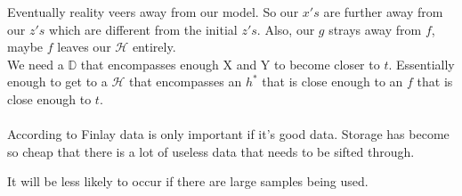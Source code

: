\documentclass[12pt]{article}
\begin{document}
\begin{enumerate}
Eventually reality veers away from our model. So our $x's$ are further away from our $z's$ which are different from the initial $z's$. Also, our $g$ strays away from $f$, maybe $f$ leaves our $\mathcal{H}$ entirely.
\\
We need a $\mathbb{D}$ that encompasses enough X and Y to become closer to $t$. Essentially enough to get to a $\mathcal{H}$ that encompasses an $h^*$ that is close enough to an $f$ that is close enough to $t$. \\
\\

According to Finlay data is only important if it's good data. Storage has become so cheap that there is a lot of useless data that needs to be sifted through.


It will be less likely to occur if there are large samples being used.

\end{enumerate}


\end{document}
